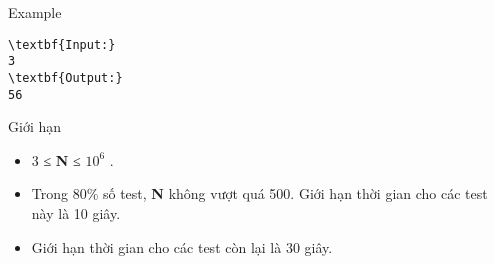 Example
\begin{verbatim}
\textbf{Input:}
3
\textbf{Output:}
56\end{verbatim}
Giới hạn
\begin{itemize}
	\item 3 ≤ \textbf{ N } ≤ $10^{6}$ .
	\item Trong 80\% số test, \textbf{ N } không vượt quá 500. Giới hạn thời gian cho các test này là 10 giây.
	\item Giới hạn thời gian cho các test còn lại là 30 giây.
\end{itemize}